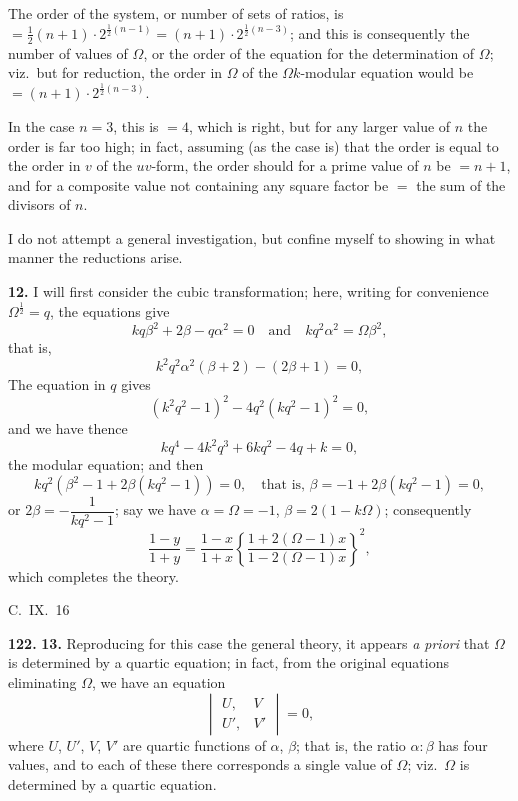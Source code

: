 \documentclass[11pt,a4paper]{article}
\theoremstyle{plain}
\begin{document}
The order of the system, or number of sets of ratios, is $= \frac{1}{2}(n + 1) \cdot 2^{\frac{1}{2}(n-1)} = (n + 1) \cdot 2^{\frac{1}{2}(n-3)}$; and this is consequently the number of values of $\Omega$, or the order of the equation for the determination of $\Omega$; viz.\ but for reduction, the order in $\Omega$ of the $\Omega k$-modular equation would be $= (n + 1) \cdot 2^{\frac{1}{2}(n-3)}$.

In the case $n = 3$, this is $= 4$, which is right, but for any larger value of $n$ the order is far too high; in fact, assuming (as the case is) that the order is equal to the order in $v$ of the $uv$-form, the order should for a prime value of $n$ be $= n + 1$, and for a composite value not containing any square factor be $=$ the sum of the divisors of $n$.

I do not attempt a general investigation, but confine myself to showing in what manner the reductions arise.

\medskip
\noindent\textbf{12.} I will first consider the cubic transformation; here, writing for convenience $\Omega^{\frac{1}{2}} = q$, the equations give
\[
kq\beta^2 + 2\beta - q\alpha^2 = 0 \quad \text{and} \quad kq^2\alpha^2 = \Omega\beta^2,
\]
that is,
\[
k^2q^2\alpha^2(\beta + 2) - (2\beta + 1) = 0,
\]
The equation in $q$ gives
\[
(k^2q^2 - 1)^2 - 4q^2(kq^2 - 1)^2 = 0,
\]
and we have thence
\[
kq^4 - 4k^2q^3 + 6kq^2 - 4q + k = 0,
\]
the modular equation; and then
\[
kq^2(\beta^2 - 1 + 2\beta(kq^2 - 1)) = 0, \quad \text{that is, } \beta = -1 + 2\beta(kq^2 - 1) = 0,
\]
or $2\beta = -\dfrac{1}{kq^2 - 1}$; say we have $\alpha = \Omega = -1$, $\beta = 2(1 - k\Omega)$; consequently
\[
\frac{1 - y}{1 + y} = \frac{1 - x}{1 + x}\left\{\frac{1 + 2(\Omega - 1)x}{1 - 2(\Omega - 1)x}\right\}^2,
\]
which completes the theory.

\begin{flushright}
C.~IX.~16
\end{flushright}

\medskip
\noindent\textbf{122.} \textbf{13.} Reproducing for this case the general theory, it appears \textit{a priori} that $\Omega$ is determined by a quartic equation; in fact, from the original equations eliminating $\Omega$, we have an equation
\[
\begin{vmatrix} U, & V \\ U', & V' \end{vmatrix} = 0,
\]
where $U$, $U'$, $V$, $V'$ are quartic functions of $\alpha$, $\beta$; that is, the ratio $\alpha : \beta$ has four values, and to each of these there corresponds a single value of $\Omega$; viz.\ $\Omega$ is determined by a quartic equation.
\end{document}

